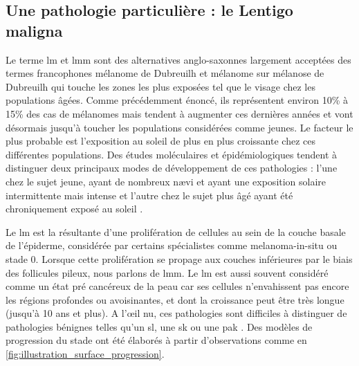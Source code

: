 \subsection{Une pathologie particulière : le Lentigo maligna}
\label{subsec:lentigo}
Le terme \gls{lm} et \gls{lmm} sont des alternatives anglo-saxonnes largement acceptées des termes francophones mélanome de Dubreuilh et mélanome sur mélanose de Dubreuilh qui touche les zones les plus exposées tel que le visage chez les populations âgées. Comme précédemment énoncé, ils représentent environ 10\% à 15\% des cas de mélanomes mais tendent à augmenter ces dernières années et vont désormais jusqu'à toucher les populations considérées comme jeunes. Le facteur le plus probable est l'exposition au soleil de plus en plus croissante chez ces différentes populations. Des études moléculaires et épidémiologiques tendent à distinguer deux principaux modes de développement de ces pathologies : l'une chez le sujet jeune, ayant de nombreux nævi et ayant une exposition solaire intermittente mais intense et l'autre chez le sujet plus âgé ayant été chroniquement exposé au soleil \cite{Baccard2009, LeGal2011, LeDuff2014}.\par

Le \gls{lm} est la résultante d'une prolifération de cellules au sein de la couche basale de l'épiderme, considérée par certains spécialistes comme melanoma-in-situ ou stade 0. Lorsque cette prolifération se propage aux couches inférieures par le biais des follicules pileux, nous parlons de \gls{lmm}. Le \gls{lm} est aussi souvent considéré comme un état pré cancéreux de la peau car ses cellules n'envahissent pas encore les régions profondes ou avoisinantes, et dont la croissance peut être très longue (jusqu'à 10 ans et plus). A l’œil nu, ces pathologies sont difficiles à distinguer de pathologies bénignes telles qu'un \gls{sl}, une \gls{sk} ou une \gls{pak} \cite{LeGal2011, LeDuff2014}. Des modèles de progression du stade ont été élaborés à partir d'observations comme en \cref{fig:illustration_surface_progression}.\par

